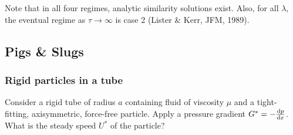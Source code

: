 \documentclass{jknotes}
\begin{document}
Note that in all four regimes, analytic similarity solutions exist. Also, for
all $\lambda$, the eventual regime as $\tau \to \infty$ is case 2 (Lister \&
Kerr, JFM, 1989).

\subsection{Pigs \& Slugs}
\subsubsection{Rigid particles in a tube}
Consider a rigid tube of radius $a$ containing fluid of viscosity $\mu$ and a
tight-fitting, axisymmetric, force-free particle. Apply a pressure gradient
$G^* = - \frac{\diffd p}{\diffd x}$. What is the steady speed $U^*$ of the
particle?
\end{document}
